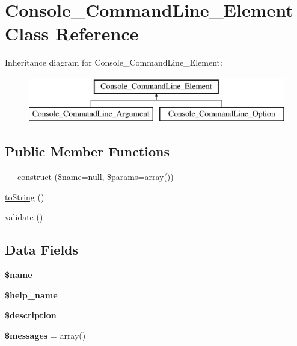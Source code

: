 \hypertarget{class_console___command_line___element}{
\section{Console\_\-CommandLine\_\-Element Class Reference}
\label{class_console___command_line___element}
}
Inheritance diagram for Console\_\-CommandLine\_\-Element:\begin{figure}[H]
\begin{center}
\leavevmode
\includegraphics[height=2.000000cm]{class_console___command_line___element}
\end{center}
\end{figure}
\subsection*{Public Member Functions}
\begin{DoxyCompactItemize}
\item 
\hyperlink{class_console___command_line___element_acce7c1c8eb94525cd672d1610bc1550e}{\_\-\_\-construct} (\$name=null, \$params=array())
\item 
\hyperlink{class_console___command_line___element_a5558c5d549f41597377fa1ea8a1cefa3}{toString} ()
\item 
\hyperlink{class_console___command_line___element_a184909dab34698899937d810a9f5d393}{validate} ()
\end{DoxyCompactItemize}
\subsection*{Data Fields}
\begin{DoxyCompactItemize}
\item 
\hypertarget{class_console___command_line___element_ab2fc40d43824ea3e1ce5d86dee0d763b}{
{\bfseries \$name}}
\label{class_console___command_line___element_ab2fc40d43824ea3e1ce5d86dee0d763b}

\item 
\hypertarget{class_console___command_line___element_a6c32e32c27813e05afc0748a8660da11}{
{\bfseries \$help\_\-name}}
\label{class_console___command_line___element_a6c32e32c27813e05afc0748a8660da11}

\item 
\hypertarget{class_console___command_line___element_a87b032cba06009e3467abf1c8018d960}{
{\bfseries \$description}}
\label{class_console___command_line___element_a87b032cba06009e3467abf1c8018d960}

\item 
\hypertarget{class_console___command_line___element_a21a183f927a6d243fe6b4ba3a6c4d4c8}{
{\bfseries \$messages} = array()}
\label{class_console___command_line___element_a21a183f927a6d243fe6b4ba3a6c4d4c8}

\end{DoxyCompactItemize}


